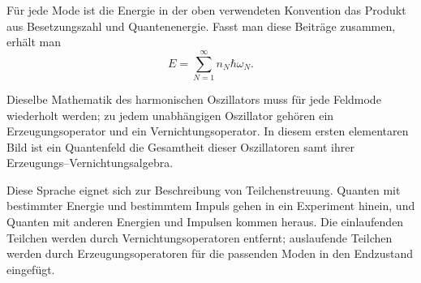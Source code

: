 Für jede Mode ist die Energie in der oben verwendeten Konvention das Produkt aus Besetzungszahl und Quantenenergie. Fasst man diese Beiträge zusammen, erhält man
\begin{equation}
E=\sum_{N=1}^{\infty} n_N\hbar\omega_N.
\end{equation}

Dieselbe Mathematik des harmonischen Oszillators muss für jede Feldmode wiederholt werden; zu jedem unabhängigen Oszillator gehören ein Erzeugungsoperator und ein Vernichtungsoperator. In diesem ersten elementaren Bild ist ein Quantenfeld die Gesamtheit dieser Oszillatoren samt ihrer Erzeugungs--Vernichtungsalgebra.

Diese Sprache eignet sich zur Beschreibung von Teilchenstreuung. Quanten mit bestimmter Energie und bestimmtem Impuls gehen in ein Experiment hinein, und Quanten mit anderen Energien und Impulsen kommen heraus. Die einlaufenden Teilchen werden durch Vernichtungsoperatoren entfernt; auslaufende Teilchen werden durch Erzeugungsoperatoren für die passenden Moden in den Endzustand eingefügt.

\begin{classroomqa}\end{classroomqa}